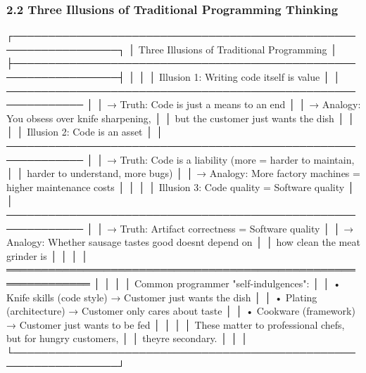 \documentclass[
]{article}
\newenvironment{Shaded}{}{}
\newcommand{\NormalTok}[1]{#1}
\begin{document}
\hypertarget{22-three-illusions-of-traditional-programming-thinking}{%
\subsubsection{2.2 Three Illusions of Traditional Programming
Thinking}\label{22-three-illusions-of-traditional-programming-thinking}}

\begin{Shaded}
\begin{Highlighting}[]
\NormalTok{┌─────────────────────────────────────────────────────────────────┐}
\NormalTok{│          Three Illusions of Traditional Programming              │}
\NormalTok{├─────────────────────────────────────────────────────────────────┤}
\NormalTok{│                                                                  │}
\NormalTok{│  Illusion 1: Writing code itself is value                       │}
\NormalTok{│  ─────────────────────────────────────────────────────────────  │}
\NormalTok{│  → Truth: Code is just a means to an end                        │}
\NormalTok{│  → Analogy: You obsess over knife sharpening,                   │}
\NormalTok{│            but the customer just wants the dish                 │}
\NormalTok{│                                                                  │}
\NormalTok{│  Illusion 2: Code is an asset                                   │}
\NormalTok{│  ─────────────────────────────────────────────────────────────  │}
\NormalTok{│  → Truth: Code is a liability (more = harder to maintain,       │}
\NormalTok{│           harder to understand, more bugs)                      │}
\NormalTok{│  → Analogy: More factory machines = higher maintenance costs    │}
\NormalTok{│                                                                  │}
\NormalTok{│  Illusion 3: Code quality = Software quality                    │}
\NormalTok{│  ─────────────────────────────────────────────────────────────  │}
\NormalTok{│  → Truth: Artifact correctness = Software quality               │}
\NormalTok{│  → Analogy: Whether sausage tastes good doesn\textquotesingle{}t depend on       │}
\NormalTok{│            how clean the meat grinder is                        │}
\NormalTok{│                                                                  │}
\NormalTok{│  ══════════════════════════════════════════════════════════════  │}
\NormalTok{│                                                                  │}
\NormalTok{│  Common programmer "self{-}indulgences":                          │}
\NormalTok{│  • Knife skills (code style)  → Customer just wants the dish    │}
\NormalTok{│  • Plating (architecture)     → Customer only cares about taste │}
\NormalTok{│  • Cookware (framework)       → Customer just wants to be fed   │}
\NormalTok{│                                                                  │}
\NormalTok{│  These matter to professional chefs, but for hungry customers,  │}
\NormalTok{│  they\textquotesingle{}re secondary.                                             │}
\NormalTok{│                                                                  │}
\NormalTok{└─────────────────────────────────────────────────────────────────┘}
\end{Highlighting}
\end{Shaded}
\end{document}
